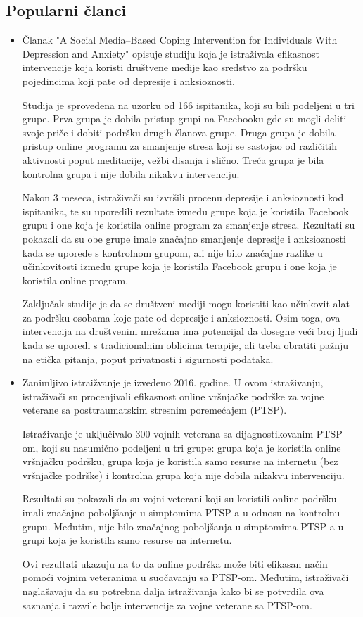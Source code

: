 \documentclass[a4paper]{article}
\begin{document}
\subsection{Popularni članci}
\begin{itemize}
\item Članak "A Social Media–Based Coping Intervention for Individuals With Depression and Anxiety" \cite{deset} opisuje studiju koja je istraživala efikasnost intervencije koja koristi društvene medije kao sredstvo za podršku pojedincima koji pate od depresije i anksioznosti.

Studija je sprovedena na uzorku od 166 ispitanika, koji su bili podeljeni u tri grupe. Prva grupa je dobila pristup grupi na Facebooku gde su mogli deliti svoje priče i dobiti podršku drugih članova grupe. Druga grupa je dobila pristup online programu za smanjenje stresa koji se sastojao od različitih aktivnosti poput meditacije, vežbi disanja i slično. Treća grupa je bila kontrolna grupa i nije dobila nikakvu intervenciju.

Nakon 3 meseca, istraživači su izvršili procenu depresije i anksioznosti kod ispitanika, te su uporedili rezultate između grupe koja je koristila Facebook grupu i one koja je koristila online program za smanjenje stresa. Rezultati su pokazali da su obe grupe imale značajno smanjenje depresije i anksioznosti kada se uporede s kontrolnom grupom, ali nije bilo značajne razlike u učinkovitosti između grupe koja je koristila Facebook grupu i one koja je koristila online program.

Zaključak studije je da se društveni mediji mogu koristiti kao učinkovit alat za podršku osobama koje pate od depresije i anksioznosti. Osim toga, ova intervencija na društvenim mrežama ima potencijal da dosegne veći broj ljudi kada se uporedi s tradicionalnim oblicima terapije, ali treba obratiti pažnju na etička pitanja, poput privatnosti i sigurnosti podataka.

\item Zanimljivo istraižvanje je izvedeno 2016. godine. U ovom istraživanju, istraživači su procenjivali efikasnost online vršnjačke podrške za vojne veterane sa posttraumatskim stresnim poremećajem (PTSP).

Istraživanje je uključivalo 300 vojnih veterana sa dijagnostikovanim PTSP-om, koji su nasumično podeljeni u tri grupe: grupa koja je koristila online vršnjačku podršku, grupa koja je koristila samo resurse na internetu (bez vršnjačke podrške) i kontrolna grupa koja nije dobila nikakvu intervenciju.

Rezultati su pokazali da su vojni veterani koji su koristili online podršku imali značajno poboljšanje u simptomima PTSP-a u odnosu na kontrolnu grupu. Međutim, nije bilo značajnog poboljšanja u simptomima PTSP-a u grupi koja je koristila samo resurse na internetu.

Ovi rezultati ukazuju na to da online podrška može biti efikasan način pomoći vojnim veteranima u suočavanju sa PTSP-om. Međutim, istraživači naglašavaju da su potrebna dalja istraživanja kako bi se potvrdila ova saznanja i razvile bolje intervencije za vojne veterane sa PTSP-om.
\end{itemize}
\end{document}
